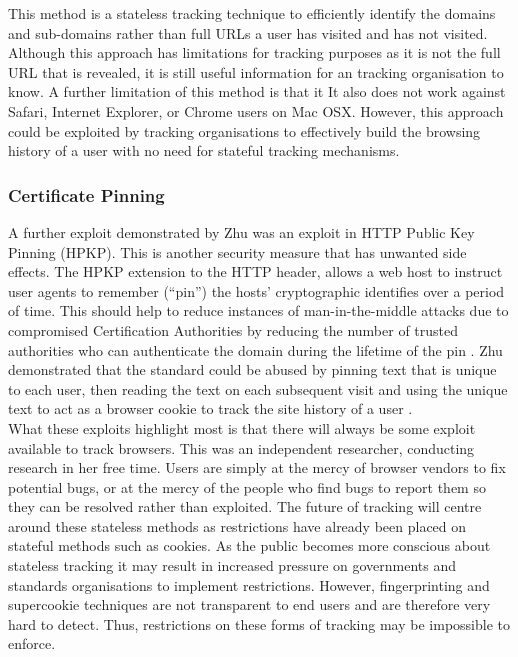 \documentclass[12pt]{article}
\begin{document}
This method is a stateless tracking technique to efficiently identify the domains and sub-domains rather than full URLs a user has visited and has not visited. Although this approach has limitations for tracking purposes as it is not the full URL that is revealed, it is still useful information for an tracking organisation to know. A further limitation of this method is that it It also does not work against Safari, Internet Explorer, or Chrome users on Mac OSX. However, this approach could be exploited by tracking organisations to effectively build the browsing history of a user with no need for stateful tracking mechanisms. 

\subsubsection{Certificate Pinning}
A further exploit demonstrated by Zhu was an exploit in HTTP Public Key Pinning (HPKP). This is another security measure that has unwanted side effects. The HPKP extension to the HTTP header, allows a web host to instruct user agents to remember (``pin'') the hosts' cryptographic identifies over a period of time. This should help to reduce instances of man-in-the-middle attacks due to compromised Certification Authorities by reducing the number of trusted authorities who can authenticate the domain during the lifetime of the pin \parencite{HPKP}. Zhu demonstrated that the standard could be abused by pinning text that is unique to each user, then reading the text on each subsequent visit and using the unique text to act as a browser cookie to track the site history of a user \parencite{newTracking}. \\

What these exploits highlight most is that there will always be some exploit available to track browsers. This was an independent researcher, conducting research in her free time. Users are simply at the mercy of browser vendors to fix potential bugs, or at the mercy of the people who find bugs to report them so they can be resolved rather than exploited. The future of tracking will centre around these stateless methods as restrictions have already been placed on stateful methods such as cookies. As the public becomes more conscious about stateless tracking it may result in increased pressure on governments and standards organisations to implement restrictions. However, fingerprinting and supercookie techniques are not transparent to end users and are therefore very hard to detect. Thus, restrictions on these forms of tracking may be impossible to enforce. 
\end{document}
